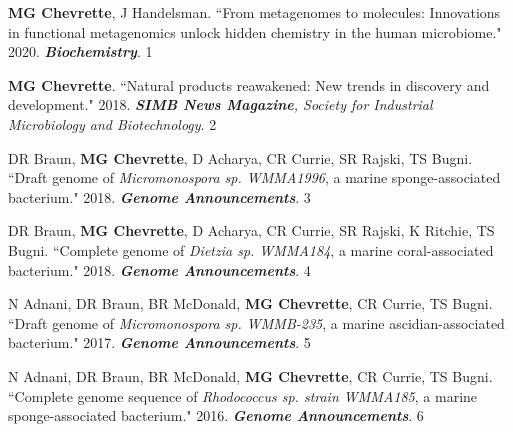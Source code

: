 \begin{cvpubs}


\cvpub
{\textbf{MG Chevrette}, J Handelsman. ``From metagenomes to molecules: Innovations in functional metagenomics unlock hidden chemistry in the human microbiome." 2020. \textit{\textbf{Biochemistry}}. \textbf{\textit{}}}
{1}

\cvpub
{\textbf{MG Chevrette}. ``Natural products reawakened: New trends in discovery and development." 2018. \textit{\textbf{SIMB News Magazine}, Society for Industrial Microbiology and Biotechnology}. }
{2}

\cvpub
{DR Braun, \textbf{MG Chevrette}, D Acharya, CR Currie, SR Rajski, TS Bugni. ``Draft genome of \textit{Micromonospora sp. WMMA1996}, a marine sponge-associated bacterium." 2018. \textit{\textbf{Genome Announcements}}. \textbf{\textit{}}}
{3}

\cvpub
{DR Braun, \textbf{MG Chevrette}, D Acharya, CR Currie, SR Rajski, K Ritchie, TS Bugni. ``Complete genome of \textit{Dietzia sp. WMMA184}, a marine coral-associated bacterium." 2018. \textit{\textbf{Genome Announcements}}. \textbf{\textit{}}}
{4}

\cvpub
{N Adnani, DR Braun, BR McDonald, \textbf{MG Chevrette}, CR Currie, TS Bugni. ``Draft genome of \textit{Micromonospora sp. WMMB-235}, a marine ascidian-associated bacterium." 2017. \textit{\textbf{Genome Announcements}}. \textbf{\textit{}}}
{5}

\cvpub
{N Adnani, DR Braun, BR McDonald, \textbf{MG Chevrette}, CR Currie, TS Bugni. ``Complete genome sequence of \textit{Rhodococcus sp. strain WMMA185}, a marine sponge-associated bacterium." 2016. \textit{\textbf{Genome Announcements}}. \textbf{\textit{}}}
{6}

\end{cvpubs}


 \vspace{-2mm}

